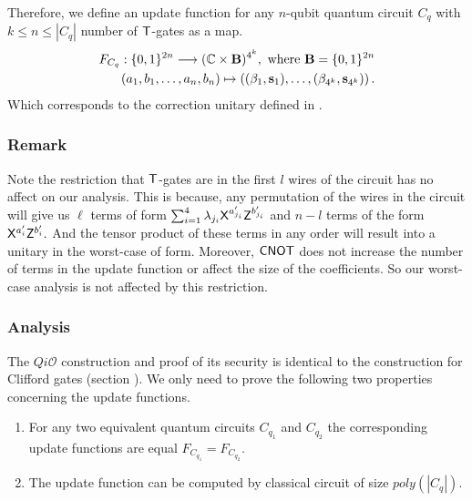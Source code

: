 Therefore, we define an update function for any $n$-qubit quantum circuit $C_q$ with $k\leq n\leq |C_q|$ number of ${\sf T}$-gates as a map.
\begin{equation}
\label{nqubit:eq10}
\begin{aligned}
 F_{C_q}:\{0,1\}^{2n}\longrightarrow  (\mathbb{C} \times {\bf B})^{4^k}, \mbox{ where } {\bf B}=\{0,1\}^{2n}\\
  (a_1,b_1,\ldots, a_n,b_n) \mapsto \left((\beta_1, {\bf s}_1),\dots, (\beta_{4^k}, {\bf s}_{4^k})\right).
\end{aligned}
\end{equation}
Which corresponds to the correction unitary defined in .
\subsubsection{Remark}
\label{remark:nqubit-correction1}
Note the restriction that ${\sf T}$-gates are in the first $l$ wires of the circuit has no affect on our analysis. This is because, any permutation of the wires in the circuit will give us $\ell$ terms of form $\sum_{i=1}^4 \lambda_{j_i} {\sf X}^{a_{j_i}^\prime} {\sf Z}^{b_{j_i}^\prime}$ and $n-l$ terms of the form ${\sf X}^{a_{i}^\prime} {\sf Z}^{b_{i}^\prime}.$  And the tensor product of these terms in any order will result into a unitary in the worst-case of form. Moreover, ${\sf CNOT}$ does not increase the number of terms in the update function or affect the size of the coefficients. So our worst-case analysis is not affected by this restriction.


\subsubsection{Analysis}
The $Qi\mathcal{O}$ construction and proof of its security is identical to the  construction for Clifford gates (section ). We only need to prove the following two properties concerning the update functions.
\begin{enumerate}
\item For any two equivalent quantum circuits $C_{q_1}$ and $C_{q_2}$ the corresponding update functions are equal $F_{C_{q_1}}=F_{C_{q_2}}.$
\item The update function can be computed by classical circuit of size $poly(|C_q|).$
\end{enumerate}


